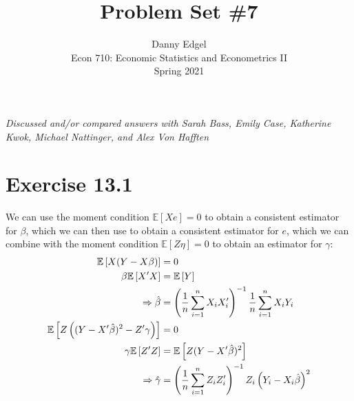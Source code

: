 \documentclass{article}
\newcommand{\est}[1]{\frac{1}{\lowercase{#1}}\sum_{i=1}^{\lowercase{#1}}}
\newcommand{\bhat}{\hat{\beta}}
\newcommand{\E}[1]{\mathbb{E}\left[#1\right]}%
\begin{document}

\title{	Problem Set \#7 }
\author{ 	Danny Edgel 										\\ 
			Econ 710: Economic Statistics and Econometrics II	\\
			Spring 2021											\\
		}
\maketitle\thispagestyle{empty}


\noindent\textit{Discussed and/or compared answers with Sarah Bass, Emily Case, Katherine Kwok, Michael Nattinger, and Alex Von Hafften}



\section*{Exercise 13.1}
We can use the moment condition ${\E{Xe}=0}$ to obtain a consistent estimator for $\beta$, which we can then use to obtain a consistent estimator for $e$, which we can combine with the moment condition ${\E{Z\eta}=0}$ to obtain an estimator for $\gamma$:
\begin{align*}
								\E{X(Y-X\beta)}	&=	0																\\
								\beta\E{X'X}	&= \E{Y}															\\
							\Rightarrow \bhat 	&= \left(\est{n}X_iX_i'\right)^{-1}\est{n}X_iY_i					\\
	\E{Z\left((Y-X'\bhat)^2-Z'\gamma\right)}	&= 0																\\
								\gamma\E{Z'Z}	&= \E{Z(Y-X'\bhat)^2}												\\
						\Rightarrow\hat{\gamma}	&= \left(\est{n}Z_iZ_i'\right)^{-1}Z_i\left(Y_i-X_i\bhat\right)^2
\end{align*}
\end{document}
